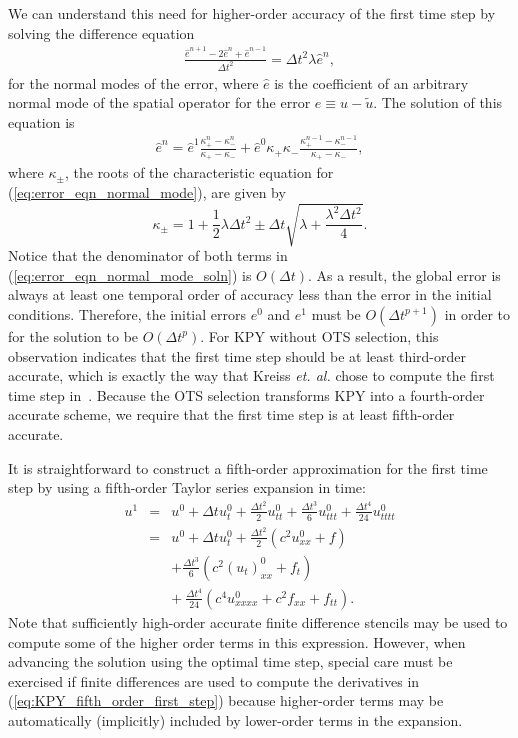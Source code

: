\documentclass[twocolumn]{article} %
\newcommand{\beq}{\begin{equation}}
\newcommand{\eeq}{\end{equation}}
\newcommand{\bea}{\begin{eqnarray}}
\newcommand{\eea}{\end{eqnarray}}
\def\etal{{\it et. al. }}
\def\tu{\tilde{u}}
\def\dt{\Delta t}
\def\he{\hat{e}}
\begin{document}
We can understand this need for higher-order accuracy of the first time step 
by solving the difference equation
\bea
  \frac{\he^{n+1} - 2 \he^{n} + \he^{n-1}}
       {\dt^2} = \dt^2 \lambda \he^{n}
  \label{eq:error_eqn_normal_mode},
\eea
for the normal modes of the error, 
where $\he$ is the coefficient of an arbitrary normal mode of the spatial
operator for the error $e \equiv u - \tu$.  The solution of this equation 
is~\cite{carrier_pearson_book}
\bea
  \he^n = \he^1 \frac{\kappa_+^n - \kappa_-^n}{\kappa_+ - \kappa_-} 
      + \he^0 \kappa_+ \kappa_- 
        \frac{\kappa_+^{n-1} - \kappa_-^{n-1}}{\kappa_+ - \kappa_-},
  \label{eq:error_eqn_normal_mode_soln}
\eea
where $\kappa_\pm$, the roots of the characteristic equation for 
(\ref{eq:error_eqn_normal_mode}), are given by~\cite{kreiss2002}
\beq
  \kappa_\pm = 1 + \frac{1}{2} \lambda \dt^2 
             \pm \dt \sqrt{\lambda + \frac{\lambda^2 \dt^2}{4}}.
\eeq
Notice that the denominator of both terms in 
(\ref{eq:error_eqn_normal_mode_soln}) is $O(\dt)$.  As a result, the 
global error is always at least one temporal order of accuracy less than the 
error in the initial conditions.  Therefore, the initial errors $e^0$ and 
$e^1$ must be $O(\dt^{p+1})$ in order to for the solution to be $O(\dt^p)$. 
For KPY without OTS selection, this observation indicates that the first
time step should be at least third-order accurate, which is exactly the way
that Kreiss \etal chose to compute the first time step in~\cite{kreiss2002}.
Because the OTS selection transforms KPY into a fourth-order accurate scheme, 
we require that the first time step is at least fifth-order accurate.

It is straightforward to construct a fifth-order approximation for the first 
time step by using a fifth-order Taylor series expansion in time:
\bea
  u^1 &=& u^0 + \dt u_t^0 + \frac{\dt^2}{2} u_{tt}^0
      + \frac{\dt^3}{6} u_{ttt}^0 
   + \frac{\dt^4}{24} u_{tttt}^0
  \nonumber \\
  &=& u^0 + \dt u_t^0 + \frac{\dt^2}{2} \left(c^2 u_{xx}^0 + f\right)
  \nonumber \\
  & & + \frac{\dt^3}{6} \left(c^2 \left(u_t\right)_{xx}^0 + f_t\right)
  \nonumber \\
  & & + \ \frac{\dt^4}{24} \left(c^4 u_{xxxx}^0 + c^2 f_{xx} + f_{tt}\right).
  \label{eq:KPY_fifth_order_first_step}
\eea
Note that sufficiently high-order accurate finite difference stencils may be 
used to compute some of the higher order terms in this expression.  However,
when advancing the solution using the optimal time step, special care must be 
exercised if finite differences are used to compute the derivatives in 
(\ref{eq:KPY_fifth_order_first_step}) because higher-order terms may be 
automatically (implicitly) included by lower-order terms in the expansion.
\end{document}
